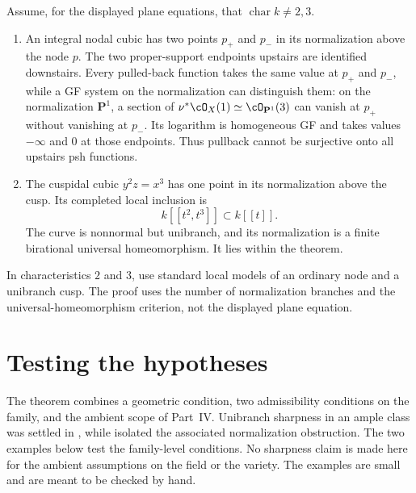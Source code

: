 \begin{example}
\label{ex:bj-node-cusp}
Assume, for the displayed plane equations, that
$\operatorname{char}k\ne2,3$.
\begin{enumerate}
\item An integral nodal cubic has two points $p_+$ and $p_-$ in its
normalization above the node $p$.  The two proper-support endpoints
upstairs are identified downstairs.  Every pulled-back function takes the
same value at $p_+$ and $p_-$, while a GF system on the normalization
can distinguish them: on the normalization $\mathbf P^1$, a section of
$\nu^*\cO_X(1)\simeq\cO_{\mathbf P^1}(3)$ can vanish at $p_+$ without
vanishing at $p_-$. Its logarithm is homogeneous GF and takes values
$-\infty$ and $0$ at those endpoints. Thus pullback cannot be surjective
onto all upstairs psh functions.
\item The cuspidal cubic $y^2z=x^3$ has one point in its normalization
above the cusp.  Its completed local inclusion is
\[
                         k[[t^2,t^3]]\subset k[[t]].
\]
The curve is nonnormal but unibranch, and its normalization is a finite
birational universal homeomorphism.  It lies within the theorem.
\end{enumerate}
\end{example}

\begin{remark}
\label{rem:ch37-node-cusp-characteristic}
In characteristics $2$ and $3$, use standard local models of an ordinary
node and a unibranch cusp.  The proof uses the number of normalization
branches and the universal-homeomorphism criterion, not the displayed
plane equation.
\end{remark}


\section{Testing the hypotheses}
\label{sec:ch37-testing}

The theorem combines a geometric condition, two admissibility conditions on
the family, and the ambient scope of Part~IV.  Unibranch sharpness in an ample
class was settled in , while
 isolated the associated normalization obstruction.
The two examples below test the family-level conditions.  No sharpness claim
is made here for the ambient assumptions on the field or the variety.  The
examples are small and are meant to be checked by hand.

